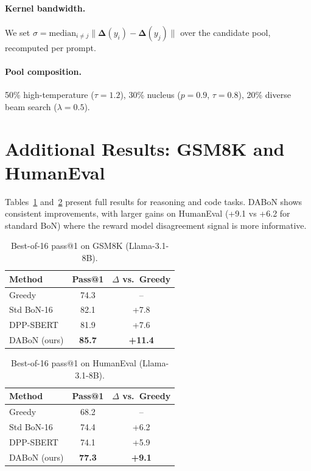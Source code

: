 \documentclass{article}
\newcommand{\Deltavec}{\boldsymbol{\Delta}}
\begin{document}
\paragraph{Kernel bandwidth.}
We set $\sigma = \text{median}_{i \ne j}\|\Deltavec(y_i) - \Deltavec(y_j)\|$
over the candidate pool, recomputed per prompt.

\paragraph{Pool composition.}
50\% high-temperature ($\tau=1.2$), 30\% nucleus ($p=0.9$, $\tau=0.8$),
20\% diverse beam search ($\lambda=0.5$).

\section{Additional Results: GSM8K and HumanEval}
\label{app:additional}

Tables~\ref{tab:gsm8k} and~\ref{tab:humaneval} present full results for
reasoning and code tasks.  DABoN shows consistent improvements, with
larger gains on HumanEval (+9.1 vs +6.2 for standard BoN) where the
reward model disagreement signal is more informative.

\begin{table}[h]
\centering
\caption{Best-of-16 pass@1 on GSM8K (Llama-3.1-8B).}
\label{tab:gsm8k}
\small
\begin{tabular}{lcc}
\toprule
Method & Pass@1 & $\Delta$ vs.\ Greedy \\
\midrule
Greedy       & 74.3 & -- \\
Std BoN-16   & 82.1 & +7.8 \\
DPP-SBERT    & 81.9 & +7.6 \\
DABoN (ours) & \textbf{85.7} & \textbf{+11.4} \\
\bottomrule
\end{tabular}
\end{table}

\begin{table}[h]
\centering
\caption{Best-of-16 pass@1 on HumanEval (Llama-3.1-8B).}
\label{tab:humaneval}
\small
\begin{tabular}{lcc}
\toprule
Method & Pass@1 & $\Delta$ vs.\ Greedy \\
\midrule
Greedy       & 68.2 & -- \\
Std BoN-16   & 74.4 & +6.2 \\
DPP-SBERT    & 74.1 & +5.9 \\
DABoN (ours) & \textbf{77.3} & \textbf{+9.1} \\
\bottomrule
\end{tabular}
\end{table}
\end{document}
